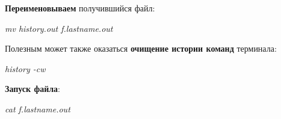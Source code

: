 \documentclass[a4paper, 14pt]{article}
\begin{document}
	\vspace{0.2cm}
	
	\textbf{Переименовываем} получившийся файл:
	
	\textit{mv history.out f.lastname.out}
	
	\vspace{3cm}
	
	Полезным может также оказаться \textbf{очищение истории команд} терминала:
	
	\textit{history -cw}
	
	\vspace{0.2cm}

	\textbf{Запуск файла}:
	
	\textit{cat f.lastname.out}
	
	
	
	
	
	
	
\end{document}
